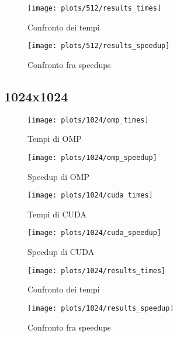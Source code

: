 \begin{figure}[H]
    \centering
    \begin{minipage}{0.49\textwidth}
        \centering
        \texttt{[image: plots/512/results\_times]}
        \caption{Confronto dei tempi}\label{fig:tempi-512}
    \end{minipage}
    \begin{minipage}{0.49\textwidth}
        \centering
        \texttt{[image: plots/512/results\_speedup]}
        \caption{Confronto fra speedups}\label{fig:speedups-512}
    \end{minipage}
\end{figure}

\subsection{1024x1024}\label{subsec:1024x1024}
\begin{figure}[H]
    \centering
    \begin{minipage}{0.49\textwidth}
        \centering
        \texttt{[image: plots/1024/omp\_times]}
        \caption{Tempi di OMP}\label{fig:times-1024-omp}
    \end{minipage}
    \begin{minipage}{0.49\textwidth}
        \centering
        \texttt{[image: plots/1024/omp\_speedup]}
        \caption{Speedup di OMP}\label{fig:speedup-1024-omp}
    \end{minipage}
\end{figure}

\begin{figure}[H]
    \centering
    \begin{minipage}{0.49\textwidth}
        \centering
        \texttt{[image: plots/1024/cuda\_times]}
        \caption{Tempi di CUDA}\label{fig:times-1024-cuda}
    \end{minipage}
    \begin{minipage}{0.49\textwidth}
        \centering
        \texttt{[image: plots/1024/cuda\_speedup]}
        \caption{Speedup di CUDA}\label{fig:speedup-1024-cuda}
    \end{minipage}
\end{figure}

\begin{figure}[H]
    \centering
    \begin{minipage}{0.49\textwidth}
        \centering
        \texttt{[image: plots/1024/results\_times]}
        \caption{Confronto dei tempi}\label{fig:tempi-1024}
    \end{minipage}
    \begin{minipage}{0.49\textwidth}
        \centering
        \texttt{[image: plots/1024/results\_speedup]}
        \caption{Confronto fra speedups}\label{fig:speedups-1024}
    \end{minipage}
\end{figure}